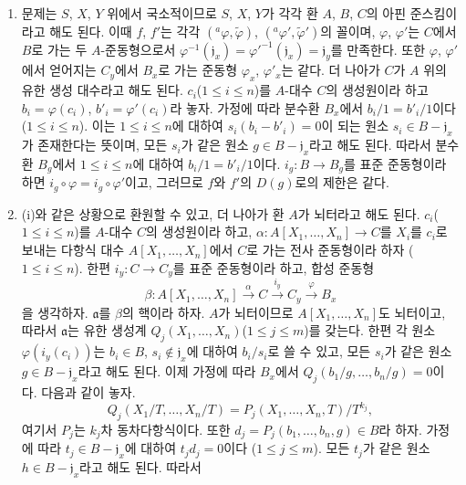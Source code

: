 \begin{enumerate}
  \item[\rm(i)] 문제는 $S$, $X$, $Y$ 위에서 국소적이므로 $S$, $X$, $Y$가
    각각 환 $A$, $B$, $C$의 아핀 준스킴이라고 해도 된다. 이때 $f$, $f'$는
    각각 $({}^a\varphi,\widetilde{\varphi})$,
    $({}^a\varphi',\widetilde{\varphi}')$의 꼴이며, $\varphi$, $\varphi'$는
    $C$에서 $B$로 가는 두 $A$-준동형으로서
    $\varphi^{-1}(\mathfrak{j}_x)
    ={\varphi'}^{-1}(\mathfrak{j}_x)=\mathfrak{j}_y$를 만족한다. 또한
    $\varphi$, $\varphi'$에서 얻어지는 $C_y$에서 $B_x$로
    가는 준동형 $\varphi_x$, $\varphi'_x$는 같다. 더 나아가 $C$가 $A$ 위의
    유한 생성 대수라고 해도 된다. $c_i$($1\leq i\leq n$)를 $A$-대수 $C$의
    생성원이라 하고 $b_i=\varphi(c_i)$, $b'_i=\varphi'(c_i)$라 놓자. 가정에
    따라 분수환 $B_x$에서 $b_i/1=b'_i/1$이다($1\leq i\leq n$). 이는
    $1\leq i\leq n$에 대하여 $s_i(b_i-b'_i)=0$이 되는 원소
    $s_i\in B-\mathfrak{j}_x$가 존재한다는 뜻이며, 모든 $s_i$가 같은 원소
    $g\in B-\mathfrak{j}_x$라고 해도 된다. 따라서 분수환 $B_g$에서
    $1\leq i\leq n$에 대하여 $b_i/1=b'_i/1$이다. $i_g:B\to B_g$를 표준
    준동형이라 하면 $i_g\circ\varphi=i_g\circ\varphi'$이고, 그러므로
    $f$와 $f'$의 $D(g)$로의 제한은 같다.
  \item[\rm(ii)] (i)와 같은 상황으로 환원할 수 있고, 더 나아가 환 $A$가
    뇌터라고 해도 된다. $c_i$($1\leq i\leq n$)를 $A$-대수 $C$의 생성원이라
    하고, $\alpha:A[X_1,\ldots,X_n]\to C$를 $X_i$를 $c_i$로 보내는
    다항식 대수 $A[X_1,\ldots,X_n]$에서 $C$로 가는 전사 준동형이라 하자
    ($1\leq i\leq n$). 한편 $i_y:C\to C_y$를 표준 준동형이라 하고, 합성
    준동형
    \[
      \beta:A[X_1,\ldots,X_n]
      \xrightarrow{\alpha} C
      \xrightarrow{i_y} C_y
      \xrightarrow{\varphi} B_x
    \]
    을 생각하자. $\mathfrak{a}$를 $\beta$의 핵이라 하자. $A$가 뇌터이므로
    $A[X_1,\ldots,X_n]$도 뇌터이고, 따라서 $\mathfrak{a}$는 유한 생성계
    $Q_j(X_1,\ldots,X_n)$($1\leq j\leq m$)를 갖는다. 한편 각 원소
    $\varphi(i_y(c_i))$는 $b_i\in B$, $s_i\notin\mathfrak{j}_x$에 대하여
    $b_i/s_i$로 쓸 수 있고, 모든 $s_i$가 같은 원소
    $g\in B-\mathfrak{j}_x$라고 해도 된다. 이제 가정에 따라 $B_x$에서
    $Q_j(b_1/g,\ldots,b_n/g)=0$이다. 다음과 같이 놓자.
    \[
      Q_j(X_1/T,\ldots,X_n/T)
      =P_j(X_1,\ldots,X_n,T)/T^{k_j},
    \]
    여기서 $P_j$는 $k_j$차 동차다항식이다. 또한
    $d_j=P_j(b_1,\ldots,b_n,g)\in B$라 하자. 가정에 따라
    $t_j\in B-\mathfrak{j}_x$에 대하여 $t_jd_j=0$이다
    ($1\leq j\leq m$). 모든 $t_j$가
    같은 원소 $h\in B-\mathfrak{j}_x$라고 해도 된다. 따라서

\end{enumerate}
